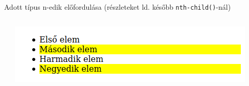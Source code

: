 \begin{frame}
  Adott típus n-edik előfordulása (részleteket ld. később \texttt{nth-child()}-nál)
  \begin{columns}[c]
      \begin{exampleblock}{}
        \scriptsize
        
        
      \end{exampleblock}
      \includegraphics[width=\textwidth]{nthoftype.png}
  \end{columns}
\end{frame}
